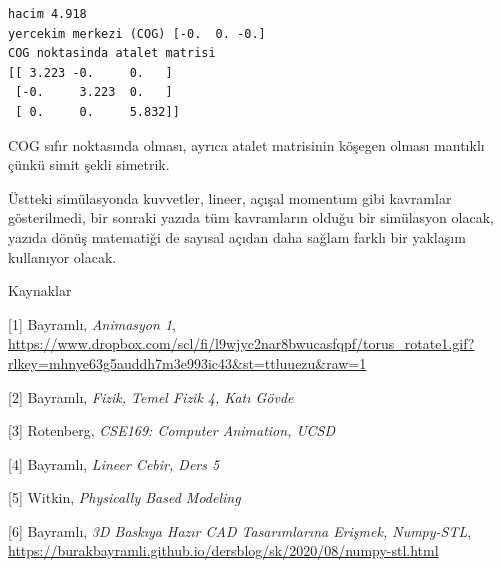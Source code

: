 \documentclass[12pt,fleqn]{article}\usepackage{../../common}
\begin{document}
\begin{verbatim}
hacim 4.918
yercekim merkezi (COG) [-0.  0. -0.]
COG noktasinda atalet matrisi
[[ 3.223 -0.     0.   ]
 [-0.     3.223  0.   ]
 [ 0.     0.     5.832]]
\end{verbatim}

COG sıfır noktasında olması, ayrıca atalet matrisinin köşegen olması mantıklı
çünkü simit şekli simetrik.

Üstteki simülasyonda kuvvetler, lineer, açışal momentum gibi kavramlar
gösterilmedi, bir sonraki yazıda tüm kavramların olduğu bir simülasyon olacak,
yazıda dönüş matematiği de sayısal açıdan daha sağlam farklı bir yaklaşım
kullanıyor olacak.  

Kaynaklar

[1] Bayramlı, {\em Animasyon 1},
    \url{https://www.dropbox.com/scl/fi/l9wjyc2nar8bwucasfqpf/torus_rotate1.gif?rlkey=mhnye63g5auddh7m3e993ic43&st=ttluuezu&raw=1}

[2] Bayramlı, {\em Fizik, Temel Fizik 4, Katı Gövde}

[3] Rotenberg, {\em CSE169: Computer Animation, UCSD}

[4] Bayramlı, {\em Lineer Cebir, Ders 5}

[5] Witkin, {\em Physically Based Modeling}

[6] Bayramlı, {\em 3D Baskıya Hazır CAD Tasarımlarına Erişmek, Numpy-STL},
    \url{https://burakbayramli.github.io/dersblog/sk/2020/08/numpy-stl.html}
\end{document}
